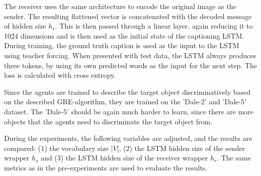 The receiver uses the same architecture to encode the original image as the sender.
The resulting flattened vector is concatenated with the decoded message of hidden size $h_r$.
This is then passed through a linear layer, again reducing it to 1024 dimensions and is then used as the initial state of the captioning LSTM.
During training, the ground truth caption is used as the input to the LSTM using teacher forcing.
When presented with test data, the LSTM always produces three tokens, by using its own predicted words as the input for the next step.
The loss is calculated with cross entropy.

Since the agents are trained to describe the target object discriminatively based on the described GRE-algorithm, they are trained on the 'Dale-2' and 'Dale-5' dataset.
The 'Dale-5' should be again much harder to learn, since there are more objects that the agents need to discriminate the target object from.

During the experiments, the following variables are adjusted, and the results are compared:
(1) the vocabulary size $|V|$,
(2) the LSTM hidden size of the sender wrapper $h_s$ and
(3) the LSTM hidden size of the receiver wrapper $h_r$.
The same metrics as in the pre-experiments are used to evaluate the results.

